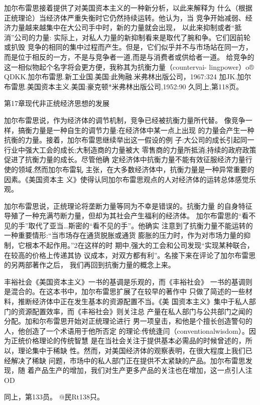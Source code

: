 加尔布雷思接着提供了对美国资本主义的一种新分析，以此来解释为
什么（根据正统理论）当经济体严重失衡时它仍然持续运转。他认为，当
竞争开始减弱、经济力量越来越集中在大公司手中时，新的力量就会出现，
以此来抑制或者“抵消”公司的力量:
实际上，对私人力量的新抑制看来是取代了腕和争。它们因前轮或扒毁
竞争的相同的集中过程而产生。但是，它们似乎并不与市场站在同一方，
而是位于相反的一方，不是与竞争者一道,而是与消费者或供给者一道。
给竞争的这一相似物起个名字将会更方便，我称其为抗衡力量（countervai-
lingpower）o®
QDKK.加尔布雷思.新工业国.美国:此殉融.米弗林出版公司，1967:324
加JK.加尔布雷思.美国资本主义.美国:豪克顿*米弗林出版公司,1952:90
久同上,第118页。

第17章现代非正统经济思想的发展


加尔布雷思说，作为经济体的调节机制，竞争已经被抗衡力量所代替。
像竞争一样，搞衡力量是一种自生的调节力量:在经济体中某一点上出现
的力量会产生一种抗衡的力量。接着，加尔布雷思继续举出这一假设的例
子:大公司的成长引起同一行业中强大工会的成长;大制造商的力量被大
零售商的力量所抵消;持续的政府政策促进了抗衡力量的成长。尽管他确
定经济体中抗衡力量不能有效征服经济力量行使的领域,然而加尔布雷轧
主张，在大多数经济体中，抗衡力量是一种异常重要的因素。《美国资本主
义》使得认同加尔布雷思观点的人对经济体的运转总体感觉乐观。

加尔布雷思说，正统理论将垄断力量等同为不幸是错误的。抗衡力量
的自身特征导殖了一种充满芍断力量，但却为其社会产生福利的经济体。
加尔布雷思的“看不见的手”取代了亚当…斯密的“看不见的手”。他确实
注意到了抗衡力量不能运转的一种重要情形:“当市场存在通货脱胀或通货
膨胀的压力时，作为对市场力量的抑制，它根本不起作用。”2在这样的时
期中,强大的工会和公司发现“实现某种联合，在较高的价格上传递其协
议成本，对双方都有利”。名接下来在评论了加尔布雷思的另两部著作之后，
我们再回到抗衡力量的概念上来。

丰裕社会《美国资本主义》一书的基调是乐观的，而《丰裕社会》
一书的基调则是混合的。在这本书中，加尔布雷思扩展了在较早的著作中
只做了简述的一些材料，推断经济体中正在发生基本的资源配置不当。《美
国资本主义》集中于私人部门的资源配置效率，而《丰裕社会》则关注总
产量在私人部门与公共部门之闻的分配。加和尔布雷思开始对正统理论进行
男一项皇击，和他是个擅长创造警句的人，他创造了一个术语用于他所否定
的理论:传统逢闫（conventionalwisdom）。因为正统价格理论的传统智慧
是在当社会关注于提供基本必需品的时候曾述的，所以，理论集中于稀缺
性。然而，对美国经济体的观察表明，在很大程度上我们已经解决了稀缺
问题，市场中的私人部门正在提供不太紧缺的产品。加尔布雷思发现，随
着产品生产的增加，我们对生产更多产品的关注也在增加，这一点引人注
OD

同上，第133员。
@民Rt138只。

